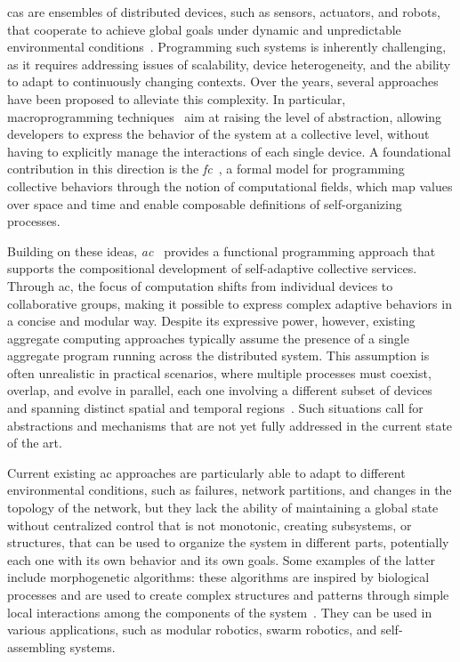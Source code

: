 \documentclass[runningheads]{llncs}
\begin{document}
    \ac{cas} are ensembles of distributed devices, such as sensors, actuators, and robots,
    that cooperate to achieve global goals under dynamic and unpredictable environmental conditions~\cite{DBLP:conf/huc/Ferscha15}.
    Programming such systems is inherently challenging,
    as it requires addressing issues of scalability, device heterogeneity,
    and the ability to adapt to continuously changing contexts.
    Over the years,
    several approaches have been proposed to alleviate this complexity.
    In particular,
    macroprogramming techniques~\cite{casadei22} aim at raising the level of abstraction,
    allowing developers to express the behavior of the system at a collective level,
    without having to explicitly manage the interactions of each single device.
    A foundational contribution in this direction is the \emph{\ac{fc}}~\cite{JLAMP2019,TOCL2019},
    a formal model for programming collective behaviors through the notion of computational fields,
    which map values over space and time and enable composable definitions of self-organizing processes.

    Building on these ideas,
    \emph{\ac{ac}}~\cite{BealIEEEComputer2015} provides a functional programming approach that supports the compositional development of self-adaptive collective services.
    Through \ac{ac},
    the focus of computation shifts from individual devices to collaborative groups,
    making it possible to express complex adaptive behaviors in a concise and modular way.
    Despite its expressive power,
    however,
    existing aggregate computing approaches typically assume the presence of a single aggregate program running across the distributed system.
    This assumption is often unrealistic in practical scenarios,
    where multiple processes must coexist,
    overlap,
    and evolve in parallel,
    each one involving a different subset of devices and spanning distinct spatial and temporal regions~\cite{EAAI2020-processes}.
    Such situations call for abstractions and mechanisms that are not yet fully addressed in the current state of the art.

    Current existing \ac{ac} approaches are particularly able to adapt to different environmental conditions,
    such as failures, network partitions, and changes in the topology of the network,
    but they lack the ability of maintaining a global state without centralized control that is not monotonic,
    creating subsystems, or structures, that can be used to organize the system in different parts,
    potentially each one with its own behavior and its own goals.
    Some examples of the latter include morphogenetic algorithms:
    these algorithms are inspired by biological processes and are used to create complex structures and patterns
    through simple local interactions among the components of the system~\cite{DBLP:books/daglib/p/Beal12,DBLP:conf/gecco/MorganC13,DBLP:conf/gecco/ZahadatHS17}.
    They can be used in various applications, such as modular robotics, swarm robotics, and self-assembling systems.
\end{document}
